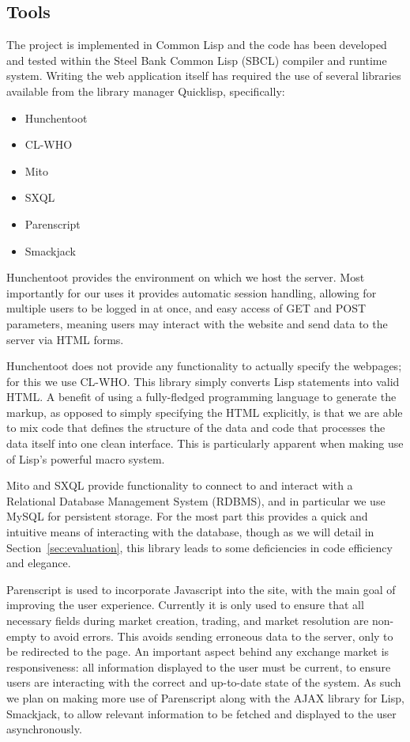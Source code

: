 \documentclass[10pt,a4paper]{article}
\theoremstyle{plain}
\theoremstyle{definition}
\begin{document}
\subsection{Tools}

The project is implemented in Common Lisp and the code has been developed and
tested within the Steel Bank Common Lisp (SBCL) compiler and runtime system.
Writing the web application itself has required the use of several libraries
available from the library manager Quicklisp, specifically:

\begin{itemize}
	\item Hunchentoot
	\item CL-WHO
	\item Mito
	\item SXQL
	\item Parenscript
	\item Smackjack
\end{itemize}

Hunchentoot provides the environment on which we host the server. Most
importantly for our uses it provides automatic session handling, allowing for
multiple users to be logged in at once, and easy access of GET and POST
parameters, meaning users may interact with the website and send data to the
server via HTML forms.

Hunchentoot does not provide any functionality to actually specify the
webpages; for this we use CL-WHO. This library simply converts Lisp statements
into valid HTML. A benefit of using a fully-fledged programming language to
generate the markup, as opposed to simply specifying the HTML explicitly, is
that we are able to mix code that defines the structure of the data and code
that processes the data itself into one clean interface. This is particularly
apparent when making use of Lisp's powerful macro system.

Mito and SXQL provide functionality to connect to and interact with a
Relational Database Management System (RDBMS), and in particular we use MySQL
for persistent storage. For the most part this provides a quick and intuitive
means of interacting with the database, though as we will detail in
Section~\ref{sec:evaluation}, this library leads to some deficiencies in code
efficiency and elegance.

Parenscript is used to incorporate Javascript into the site, with the main goal
of improving the user experience. Currently it is only used to ensure that all
necessary fields during market creation, trading, and market resolution are
non-empty to avoid errors. This avoids sending erroneous data to the server,
only to be redirected to the page. An important aspect behind any exchange
market is responsiveness: all information displayed to the user must be
current, to ensure users are interacting with the correct and up-to-date state
of the system. As such we plan on making more use of Parenscript along with the
AJAX library for Lisp, Smackjack, to allow relevant information to be fetched
and displayed to the user asynchronously.
\end{document}
